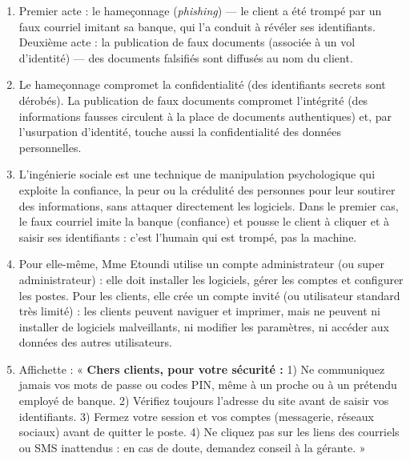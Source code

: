 \documentclass[11pt]{article}
\newcommand{\cle}[1]{{\popxbold\color{popdark}#1}}
\begin{document}
\begin{corrige}
\begin{enumerate}
\item Premier acte : le \cle{hameçonnage} (\emph{phishing}) — le client a été trompé par un faux courriel imitant sa banque, qui l'a conduit à révéler ses identifiants. Deuxième acte : la \cle{publication de faux documents} (associée à un vol d'identité) — des documents falsifiés sont diffusés au nom du client.
\item Le hameçonnage compromet la \cle{confidentialité} (des identifiants secrets sont dérobés). La publication de faux documents compromet l'\cle{intégrité} (des informations fausses circulent à la place de documents authentiques) et, par l'usurpation d'identité, touche aussi la confidentialité des données personnelles.
\item L'\cle{ingénierie sociale} est une technique de manipulation psychologique qui exploite la confiance, la peur ou la crédulité des personnes pour leur soutirer des informations, sans attaquer directement les logiciels. Dans le premier cas, le faux courriel imite la banque (confiance) et pousse le client à cliquer et à saisir ses identifiants : c'est l'humain qui est trompé, pas la machine.
\item Pour elle-même, Mme Etoundi utilise un compte \cle{administrateur} (ou super administrateur) : elle doit installer les logiciels, gérer les comptes et configurer les postes. Pour les clients, elle crée un compte \cle{invité} (ou utilisateur standard très limité) : les clients peuvent naviguer et imprimer, mais ne peuvent ni installer de logiciels malveillants, ni modifier les paramètres, ni accéder aux données des autres utilisateurs.
\item Affichette : « \textbf{Chers clients, pour votre sécurité :} 1) Ne communiquez jamais vos mots de passe ou codes PIN, même à un proche ou à un prétendu employé de banque. 2) Vérifiez toujours l'adresse du site avant de saisir vos identifiants. 3) Fermez votre session et vos comptes (messagerie, réseaux sociaux) avant de quitter le poste. 4) Ne cliquez pas sur les liens des courriels ou SMS inattendus : en cas de doute, demandez conseil à la gérante. »
\end{enumerate}
\end{corrige}
\end{document}

